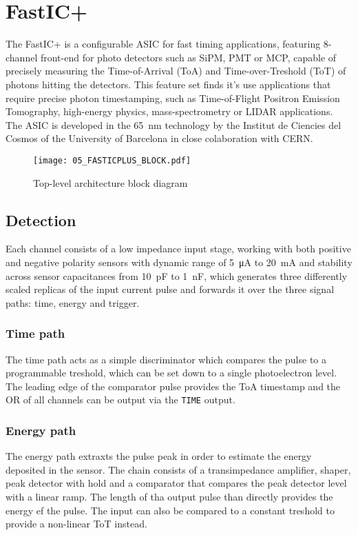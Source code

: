 \chapter{FastIC+}
The FastIC+ is a configurable ASIC for fast timing applications, featuring 8-channel front-end for photo detectors such as SiPM, PMT or MCP, capable of precisely measuring the Time-of-Arrival (ToA) and Time-over-Treshold (ToT) of photons hitting the detectors. This feature set finds it's use applications that require precise photon timestamping, such as Time-of-Flight Positron Emission Tomography, high-energy physics, mass-spectrometry or LIDAR applications. The ASIC is developed in the \SI{65}{\nano\meter} technology by the Institut de Ciencies del Cosmos of the University of Barcelona in close colaboration with CERN. 


\FloatBarrier
\begin{figure}[htp!]
    \centering
    \texttt{[image: 05\_FASTICPLUS\_BLOCK.pdf]}
    \caption{Top-level architecture block diagram}
    \label{fig:fastic_top_level}
\end{figure}
\FloatBarrier



\section{Detection}
\label{sec:fastic:detection}

Each channel consists of a low impedance input stage, working with both positive and negative polarity sensors with dynamic range of \SI{5}{\micro\ampere} to \SI{20}{\milli\ampere} and stability across sensor capacitances from \SI{10}{\pico\farad} to \SI{1}{\nano\farad}, which generates three differently scaled replicas of the input current pulse and forwards it over the three signal paths: time, energy and trigger.
%
\subsection{Time path}
The time path acts as a simple discriminator which compares the pulse to a programmable treshold, which can be set down to a single photoelectron level. The leading edge of the comparator pulse provides the ToA timestamp and the OR of all channels can be output via the \verb|TIME| output. 
%
\subsection{Energy path}
The energy path extraxts the pulse peak in order to estimate the energy deposited in the sensor. The chain consists of a transimpedance amplifier, shaper, peak detector with hold and a comparator that compares the peak detector level with a linear ramp. The length of tha output pulse than directly provides the energy ef the pulse. The input can also be compared to a constant treshold to provide a non-linear ToT instead. 

